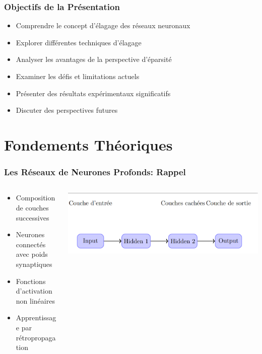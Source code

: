 \documentclass[10pt]{beamer}
\begin{document}
\begin{frame}
\frametitle{Objectifs de la Présentation}
\begin{itemize}
    \item Comprendre le concept d'élagage des réseaux neuronaux
    \item Explorer différentes techniques d'élagage
    \item Analyser les avantages de la perspective d'éparsité
    \item Examiner les défis et limitations actuels
    \item Présenter des résultats expérimentaux significatifs
    \item Discuter des perspectives futures
\end{itemize}
\end{frame}

\section{Fondements Théoriques}

\begin{frame}
\frametitle{Les Réseaux de Neurones Profonds: Rappel}
\begin{columns}
\begin{column}{0.5\textwidth}
\begin{itemize}
    \item Composition de couches successives
    \item Neurones connectés avec poids synaptiques
    \item Fonctions d'activation non linéaires
    \item Apprentissage par rétropropagation
\end{itemize}
\end{column}
\begin{column}{0.5\textwidth}
\centering
\includegraphics[width=\textwidth]{neural_network.png}
\end{column}
\end{columns}
\end{frame}
\end{document}

